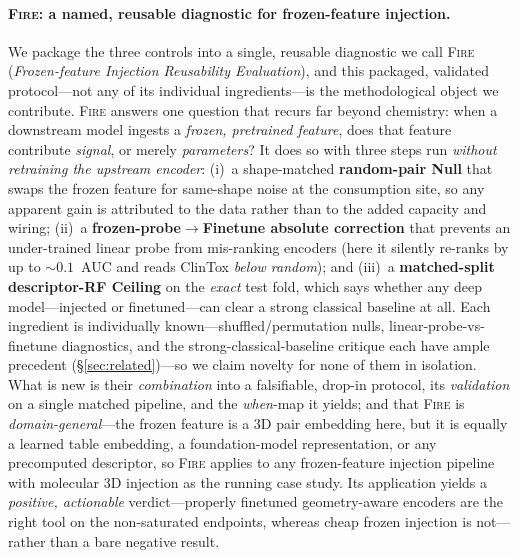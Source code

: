 \documentclass[sigconf,nonacm,anonymous,review]{acmart}
\begin{document}
\paragraph{\textsc{Fire}: a named, reusable diagnostic for frozen-feature injection.}
We package the three controls into a single, reusable diagnostic we call
\textsc{Fire} (\emph{Frozen-feature Injection Reusability Evaluation}), and
this packaged, validated protocol---not any of its individual ingredients---is
the methodological object we contribute. \textsc{Fire} answers one question
that recurs far beyond chemistry: when a downstream model ingests a
\emph{frozen, pretrained feature}, does that feature contribute \emph{signal},
or merely \emph{parameters}? It does so with three steps run \emph{without
retraining the upstream encoder}: (i)~a shape-matched \textbf{random-pair Null}
that swaps the frozen feature for same-shape noise at the consumption site, so
any apparent gain is attributed to the data rather than to the added capacity
and wiring; (ii)~a \textbf{frozen-probe$\rightarrow$Finetune absolute
correction} that prevents an under-trained linear probe from mis-ranking
encoders (here it silently re-ranks by up to $\sim$$0.1$~AUC and reads ClinTox
\emph{below random}); and (iii)~a \textbf{matched-split descriptor-RF Ceiling}
on the \emph{exact} test fold, which says whether any deep model---injected or
finetuned---can clear a strong classical baseline at all. Each ingredient is
individually known---shuffled/permutation nulls, linear-probe-vs-finetune
diagnostics, and the strong-classical-baseline critique each have ample
precedent (\S\ref{sec:related})---so we claim novelty for none of them in
isolation. What is new is their \emph{combination} into a falsifiable,
drop-in protocol, its \emph{validation} on a single matched pipeline, and the
\emph{when}-map it yields; and that \textsc{Fire} is \emph{domain-general}---the
frozen feature is a 3D pair embedding here, but it is equally a learned table
embedding, a foundation-model representation, or any precomputed descriptor, so
\textsc{Fire} applies to any frozen-feature injection pipeline with molecular 3D
injection as the running case study. Its application yields a \emph{positive,
actionable} verdict---properly finetuned geometry-aware encoders are the right
tool on the non-saturated endpoints, whereas cheap frozen injection is not---
rather than a bare negative result.
\end{document}
